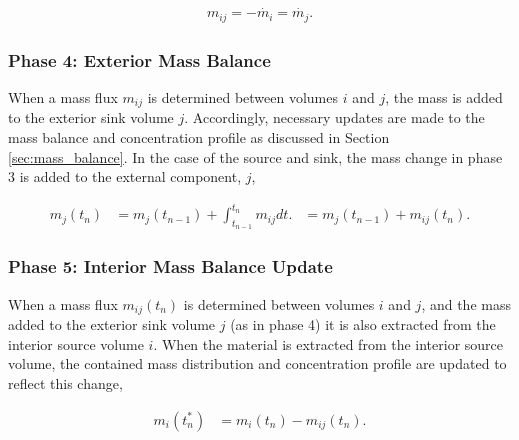 \begin{align}
m_{ij}= -\dot{m_i} = \dot{m_j}.
\end{align}

\subsubsection{Phase 4: Exterior Mass Balance}

When a mass flux $m_{ij}$ is determined between volumes $i$ and $j$, the
mass is added to the exterior sink volume $j$. Accordingly, necessary updates
are made to the mass balance and concentration profile as discussed in Section
\ref{sec:mass_balance}. In the case of the source and sink, the mass change in
phase 3 is added to the external component, $j$,

\begin{align}
        m_j(t_n) &= m_j(t_{n-1}) + \int_{t_{n-1}}^{t_n}m_{ij}dt.
                 &= m_j(t_{n-1}) + m_{ij}(t_n).
\end{align}

\subsubsection{Phase 5: Interior Mass Balance Update}

When a mass flux $m_{ij}(t_n)$ is determined between volumes $i$ and $j$, and
the mass added to the exterior sink volume $j$ (as in phase 4) it is also
extracted from the interior source volume $i$.  When the material is extracted
from the interior source volume, the contained mass distribution and
concentration profile are updated to reflect this change,

\begin{align}
  m_{i}(t_n^*) &= m_i(t_n) - m_{ij}(t_n).
\end{align}

